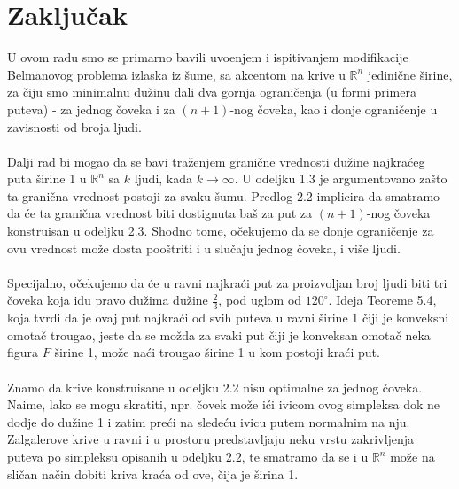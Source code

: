 \documentclass[11pt,letter]{article}
\begin{document}
\section[Zaklju\v cak]{Zaklju\v cak}
\bigskip
U ovom radu smo se primarno bavili uvo\dj enjem i ispitivanjem modifikacije Belmanovog problema izlaska iz \v sume, sa akcentom na krive u $\mathbb{R}^n$ jedini\v cne \v sirine, za \v ciju smo minimalnu du\v zinu dali dva gornja ograni\v cenja (u formi primera puteva) - za jednog \v coveka i za $(n+1)$-nog \v coveka, kao i donje ograni\v cenje u zavisnosti od broja ljudi.
\\
\\
\indent Dalji rad bi mogao da se bavi tra\v zenjem grani\v cne vrednosti du\v zine najkra\' ceg puta \v sirine 1 u $\mathbb{R}^n$ sa $k$ ljudi, kada $k\to \infty$. U odeljku 1.3 je argumentovano za\v sto ta grani\v cna vrednost postoji za svaku \v sumu. Predlog 2.2 implicira da smatramo da \' ce ta grani\v cna vrednost biti dostignuta ba\v s za put za $(n+1)$-nog \v coveka konstruisan u odeljku 2.3. Shodno tome, o\v cekujemo da se donje ograni\v cenje za ovu vrednost mo\v ze dosta poo\v striti i u slu\v caju jednog \v coveka, i vi\v se ljudi.
\\
\\
\indent Specijalno, o\v cekujemo da \' ce u ravni najkra\' ci put za proizvoljan broj ljudi biti tri \v coveka koja idu pravo du\v zima du\v zine $\frac{2}{3}$, pod uglom od $120^\circ$. Ideja Teoreme 5.4, koja tvrdi da je ovaj put najkra\' ci od svih puteva u ravni \v sirine 1 \v ciji je konveksni omota\v c trougao, jeste da se mo\v zda za svaki put \v ciji je konveksan omota\v c neka figura $F$ \v sirine 1, mo\v ze na\' ci trougao \v sirine 1 u kom postoji kra\' ci put.
\\
\\
\indent Znamo da krive konstruisane u odeljku 2.2 nisu optimalne za jednog \v coveka. Naime, lako se mogu skratiti, npr. \v covek mo\v ze i\' ci ivicom ovog simpleksa dok ne dodje do du\v zine 1 i zatim pre\' ci na slede\' cu ivicu putem normalnim na nju. Zalgalerove krive u ravni i u prostoru predstavljaju neku vrstu zakrivljenja puteva po simpleksu opisanih u odeljku 2.2, te smatramo da se i u $\mathbb{R}^n$ mo\v ze na sli\v can na\v cin dobiti kriva kra\' ca od ove, \v cija je \v sirina 1.
\bigskip
\bigskip
\end{document}
